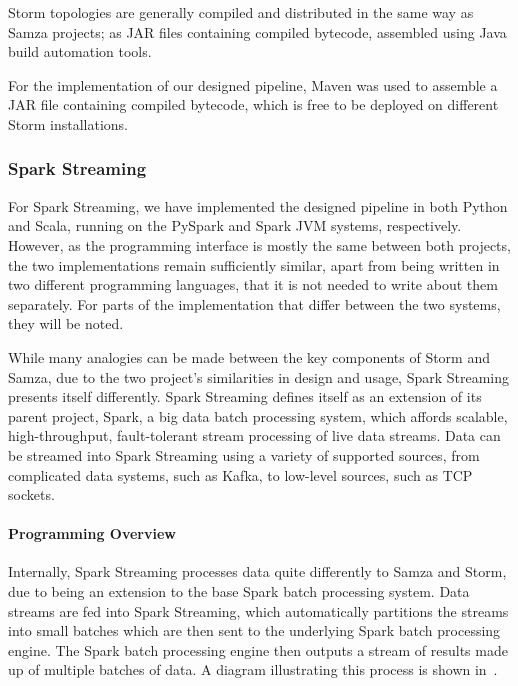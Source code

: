 Storm topologies are generally compiled and distributed in the same way as Samza projects; as JAR files containing compiled
bytecode, assembled using Java build automation tools.

For the implementation of our designed pipeline, Maven was used to assemble a JAR file containing compiled bytecode, which
is free to be deployed on different Storm installations.



\subsubsection{Spark Streaming} %
\label{ssub:impl_spark_streaming}

For Spark Streaming, we have implemented the designed pipeline in both Python and Scala, running on the PySpark and Spark
JVM systems, respectively. However, as the programming interface is mostly the same between both projects, the two
implementations remain sufficiently similar, apart from being written in two different programming languages, that it is
not needed to write about them separately. For parts of the implementation that differ between the two systems, they
will be noted.

While many analogies can be made between the key components of Storm and Samza, due to the two project's similarities in design and
usage, Spark Streaming presents itself differently. Spark Streaming defines itself as an extension of its parent project,
Spark, a big data batch processing system, which affords scalable, high-throughput, fault-tolerant stream processing of
live data streams. Data can be streamed into Spark Streaming using a variety of supported sources, from complicated data
systems, such as Kafka, to low-level sources, such as TCP sockets.

\paragraph{Programming Overview}

Internally, Spark Streaming processes data quite differently to Samza and Storm, due to being an extension to the base
Spark batch processing system. Data streams are fed into Spark Streaming, which automatically partitions the streams into
small batches which are then sent to the underlying Spark batch processing engine. The Spark batch processing engine then
outputs a stream of results made up of multiple batches of data. A diagram illustrating this process is shown in~.


